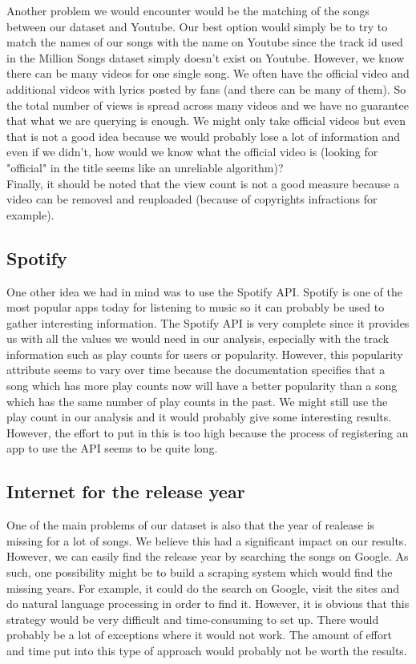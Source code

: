 \documentclass[11pt]{article}
\begin{document}
Another problem we would encounter would be the matching of the songs between our dataset and Youtube. Our best option would simply be to try to match the names of our songs with the name on Youtube since the track id used in the Million Songs dataset simply doesn’t exist on Youtube. However, we know there can be many videos
for one single song. We often have the official video and additional videos with lyrics posted by fans (and there
can be many of them). So the total number of views is spread across many videos and we have no guarantee that what we are querying is enough. We might only take official videos but even that is not a good idea because we would probably lose a lot of information and even if we didn't, how would we know what the official video is (looking for "official" in the title seems like an unreliable algorithm)?\\
Finally, it should be noted that the view count is not a good measure because a video can be removed and reuploaded (because of copyrights infractions for example).

\subsection{Spotify}
One other idea we had in mind was to use the Spotify API. Spotify is one of the most
popular apps today for listening to music so it can probably be used to gather interesting information. The
Spotify API is very complete since it provides us with all the values we would need in our analysis,
especially with the track information such as play counts for users or popularity. However, this popularity
attribute seems to vary over time because the documentation specifies that a song which has more play
counts now will have a better popularity than a song which has the same number of play counts in the
past. We might still use the play count in our analysis and it would probably give some
interesting results. However, the effort to put in this is too high because the process of registering an app to use the API seems to be quite long.

\subsection{Internet for the release year}
One of the main problems of our dataset is also that the year of realease is missing for a lot of songs. We believe this had a significant impact on our results. However, we can easily find the release year by searching the songs on Google. As such, one possibility might be to build a scraping system which would find the missing years. For example, it could do the search on Google, visit the sites and do natural language processing in order to find it. However, it is obvious that this strategy would be very difficult and time-consuming to set up. There would probably be a lot of exceptions where it would not work. The amount of effort and time put into this type of approach would probably not be worth the results. 
\end{document}

